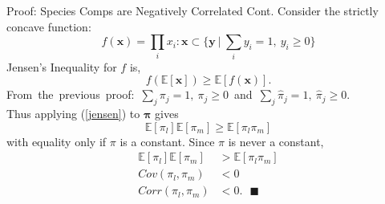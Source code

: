 \documentclass[ xcolor = pdftex, dvipsnames, table ]{beamer}
\begin{document}
%
\begin{frame}{Proof: Species Comps are Negatively Correlated Cont.}
	Consider the strictly concave function:
	\begin{equation*}
		 f(\bm{x})=\textstyle{\prod_i} x_i : \bm{x}\subset\Big\{\bm{y}~|~\textstyle{\sum_i} y_i = 1,~y_i \ge 0\Big\} 
	\end{equation*}  	
	Jensen's Inequality for $f$ is,
	\begin{equation}
		f(\mathbb{E}[\bm{x}]) \ge \mathbb{E}[f(\bm{x})].
		\label{jensen}
	\end{equation}
	\mbox{From the previous proof: $\sum_j \pi_{j} = 1,~\pi_j \ge 0$ and $\sum_j \hat\pi_{j} = 1,~\hat\pi_j \ge 0$.}\\
        Thus applying (\ref{jensen}) to $\bm{\pi}$ gives  
	\begin{equation}
		\mathbb{E}[\pi_{l}]\mathbb{E}[\pi_{m}] \ge \mathbb{E}[\pi_{l}\pi_{m}]
	\end{equation}
	with equality only if $\pi$ is a constant. Since $\pi$ is never a constant, 
	\begin{align*}
		\mathbb{E}[\pi_{l}]\mathbb{E}[\pi_{m}] &> \mathbb{E}[\pi_{l}\pi_{m}]\\
		Cov(\pi_{l}, \pi_{m})&<0\\ 
		Corr(\pi_{l}, \pi_{m})&<0. ~~~\blacksquare
	\end{align*} 
\end{frame}

%
\end{document}
